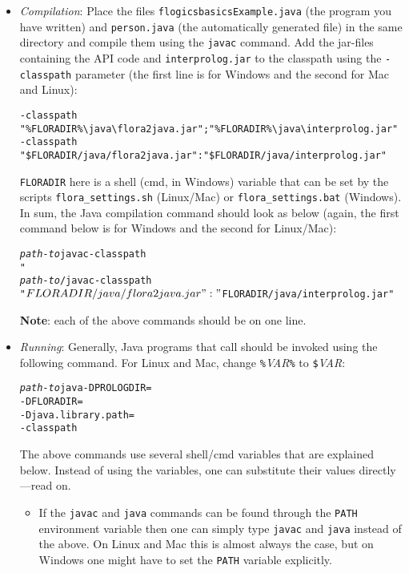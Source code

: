 \begin{itemize}
\item \emph{Compilation}:
  Place the files {\tt flogicsbasicsExample.java} (the program you have
  written) and {\tt person.java} (the automatically generated file)
in the same directory and compile them using the {\tt javac}  command. Add
the jar-files containing the API code and
{\tt interprolog.jar}  to the classpath using the \texttt{-classpath}
parameter (the first line is for Windows and the second for Mac and Linux):
\begin{verbatim}
-classpath "%FLORADIR%\java\flora2java.jar";"%FLORADIR%\java\interprolog.jar"
-classpath "$FLORADIR/java/flora2java.jar":"$FLORADIR/java/interprolog.jar"
\end{verbatim}
\texttt{FLORADIR} here is a shell (cmd, in Windows) variable that can be
set by the 
scripts \texttt{flora\_settings.sh} (Linux/Mac) or \texttt{flora\_settings.bat}
(Windows).
In sum, the Java compilation command should look as below
(again, the first command below is for
Windows and the second for Linux/Mac):
\begin{alltt}
\emph{path-to}\bs{}javac -classpath
     "%FLORADIR%\bs{}java\bs{}flora2java.jar";"%FLORADIR%\bs{}java\bs{}interprolog.jar"
\emph{path-to}/javac -classpath
     "$FLORADIR/java/flora2java.jar":"$FLORADIR/java/interprolog.jar"
\end{alltt}
\textbf{Note}: each of the above commands should be on one line.


\item \emph{Running}:  Generally, Java programs that call \FLSYSTEM
  should be invoked using the following command. For 
  Linux and Mac, change \texttt{\%}\textit{VAR}\texttt{\%} to
      \texttt{\$}\textit{VAR}:
\begin{alltt}
\emph{path-to}\bs{}java -DPROLOGDIR=%PROLOGDIR%
                -DFLORADIR=%FLORADIR%
                -Djava.library.path=%PROLOGDIR%            <--- \emph{optional}
                -classpath %MYCLASSPATH% flogicbasicsExample
\end{alltt}
The above commands use several shell/cmd variables that are explained below.
Instead of using the variables, one can substitute their values
directly---read on.

\begin{itemize}
  \item
    If the \texttt{javac} and \texttt{java} commands can be found through
    the \texttt{PATH} environment variable then one can simply type
    \texttt{javac} and \texttt{java} instead of the above.
    On Linux and Mac this is almost always the case, but on Windows one
    might have to set the \texttt{PATH} variable explicitly. 


\end{itemize}
\end{itemize}

